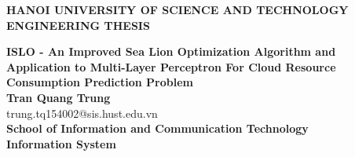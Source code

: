\documentclass[main.tex]{subfiles}
\begin{document}
\begin{titlepage}
\thispagestyle{empty}
\begin{center}

{\textbf{\large{HANOI UNIVERSITY OF SCIENCE AND TECHNOLOGY}}}\\[4cm]

{\textbf{\huge{ENGINEERING THESIS}}}\\[1cm]
{\textbf{\Large{ISLO - An Improved Sea Lion Optimization Algorithm and Application to Multi-Layer Perceptron For Cloud Resource Consumption Prediction Problem}}\\[1cm]

{\textbf{\large{Tran Quang Trung}}}\\
{\large{trung.tq154002@sis.hust.edu.vn}}\\[0.5cm]

{\textbf{\large{School of Information and Communication Technology}}}\\
{\textbf{\large{Information System}}}\\

\vspace{3.5cm}
\begin{table}[H]
\centering
{}
\end{table}}
\end{center}



\end{titlepage}
\end{document}
